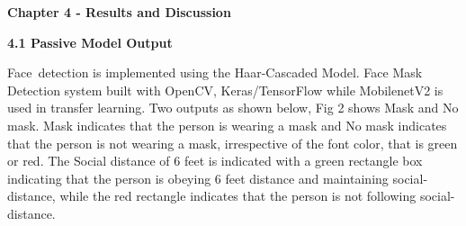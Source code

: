 \documentclass[12pt]{article}
\begin{document}
\vspace{\baselineskip}
\setlength{\parskip}{12.0pt}
\setlength{\parskip}{9.96pt}
\setlength{\parskip}{12.0pt}
\vspace{\baselineskip}
\vspace{\baselineskip}
\vspace{\baselineskip}
\vspace{\baselineskip}
\vspace{\baselineskip}
\vspace{\baselineskip}
\vspace{\baselineskip}
\vspace{\baselineskip}
\vspace{\baselineskip}
\vspace{\baselineskip}
\vspace{\baselineskip}
\vspace{\baselineskip}
\vspace{\baselineskip}
\vspace{\baselineskip}
\vspace{\baselineskip}
\vspace{\baselineskip}
\vspace{\baselineskip}
\vspace{\baselineskip}
\vspace{\baselineskip}
\vspace{\baselineskip}
\vspace{\baselineskip}

\begin{justify}
{\fontsize{18pt}{21.6pt}\selectfont \textbf{Chapter 4 - Results and Discussion}}
\end{justify}
\setlength{\parskip}{0.0pt}
\vspace{\baselineskip}
\vspace{\baselineskip}

{\fontsize{14pt}{16.8pt}\selectfont \textbf{4.1 Passive Model Output}}
\setlength{\parskip}{12.0pt}
\begin{justify}
Face\ detection is implemented using the Haar-Cascaded Model. Face Mask Detection system built with OpenCV, Keras/TensorFlow while  MobilenetV2 is used in transfer learning. Two outputs as shown below, Fig 2 shows Mask and No mask. Mask indicates that the person is wearing a mask and No mask indicates that the person is not wearing a mask, irrespective of the font color, that is green or red. The Social distance of 6 feet is indicated with a green rectangle box indicating that the person is obeying 6 feet distance and maintaining social-distance, while the red rectangle indicates that the person is not following social-distance.
\end{justify}
\end{document}
